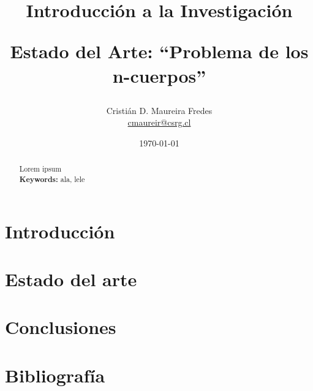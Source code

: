 \documentclass[letter, 10pt]{IEEEtran}
\begin{document}

\pagestyle{empty}

\title{Introducción a la Investigación\\ \begin{Large}Estado del Arte: ``Problema de los n-cuerpos''\end{Large}}
\author{Cristián D. Maureira Fredes\\\url{cmaureir@csrg.cl}}
\date{\today}

\maketitle
\begin{abstract}
Lorem ipsum\\
{\bf Keywords: } ala, lele
\end{abstract}

\section{Introducción}
\label{sec:introduccion}


\section{Estado del arte}
\label{sec:estado_arte}


\section{Conclusiones}
\label{sec:conclusiones}


\section{Bibliografía}

\end{document}
